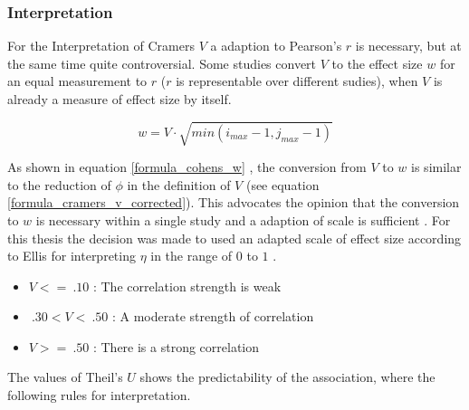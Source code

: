 \documentclass[a4paper,headsepline,footsepline,fontsize=11pt,BCOR=12mm,DIV=12]{report}
\begin{document}

\subsubsection{Interpretation}
For the Interpretation of Cramers $V$ a adaption to Pearson's $r$ is necessary, but at the same time quite controversial. Some studies convert $V$ to the effect size $w$ for an equal measurement to $r$ ($r$ is representable over different sudies), when $V$ is already a measure of effect size by itself. \cite{Baguley2016}

\smallskip
\begin{equation}
\label{formula_cohens_w}
	w = V \cdot \sqrt{min(i_{max}-1,j_{max}-1)}
\end{equation}

\medskip

As shown in equation \ref{formula_cohens_w} \cite{Baguley2016}, the conversion from $V$ to $w$ is similar to the reduction of $\phi$ in the definition of $V$ (see equation \ref{formula_cramers_v_corrected}). This advocates the opinion that the conversion to $w$ is necessary within a single study and a adaption of scale is sufficient \cite{Baguley2016}. For this thesis the decision was made to used an adapted scale of effect size according to Ellis for interpreting $\eta$ in the range of $0$ to $1$ \cite{Cohen1988,Ellis2010,Hemmerich2019}.

\begin{itemize}
	\item $V <= \: .10$ : The correlation strength is weak
	\item $\: .30 < V < \: .50$ : A moderate strength of correlation
	\item $V >= \: .50$ : There is a strong correlation
\end{itemize}

The values of Theil's $U$ shows the predictability of the association, where the following rules for interpretation. \cite{TheilsInt01,TheilsInt02,TheilsInt03}
\end{document}
